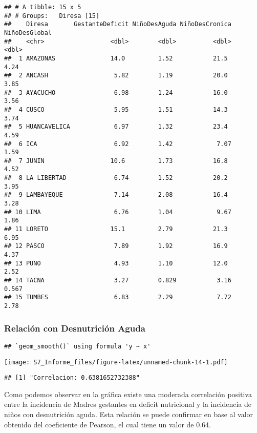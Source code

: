 \documentclass[
]{article}
\begin{document}
\begin{verbatim}
## # A tibble: 15 x 5
## # Groups:   Diresa [15]
##    Diresa       GestanteDeficit NiñoDesAguda NiñoDesCronica NiñoDesGlobal
##    <chr>                  <dbl>        <dbl>          <dbl>         <dbl>
##  1 AMAZONAS               14.0         1.52           21.5          4.24 
##  2 ANCASH                  5.82        1.19           20.0          3.85 
##  3 AYACUCHO                6.98        1.24           16.0          3.56 
##  4 CUSCO                   5.95        1.51           14.3          3.74 
##  5 HUANCAVELICA            6.97        1.32           23.4          4.59 
##  6 ICA                     6.92        1.42            7.07         1.59 
##  7 JUNIN                  10.6         1.73           16.8          4.52 
##  8 LA LIBERTAD             6.74        1.52           20.2          3.95 
##  9 LAMBAYEQUE              7.14        2.08           16.4          3.28 
## 10 LIMA                    6.76        1.04            9.67         1.86 
## 11 LORETO                 15.1         2.79           21.3          6.95 
## 12 PASCO                   7.89        1.92           16.9          4.37 
## 13 PUNO                    4.93        1.10           12.0          2.52 
## 14 TACNA                   3.27        0.829           3.16         0.567
## 15 TUMBES                  6.83        2.29            7.72         2.78
\end{verbatim}

\hypertarget{relaciuxf3n-con-desnutriciuxf3n-aguda}{%
\subsubsection{Relación con Desnutrición
Aguda}\label{relaciuxf3n-con-desnutriciuxf3n-aguda}}

\begin{verbatim}
## `geom_smooth()` using formula 'y ~ x'
\end{verbatim}

\texttt{[image: S7\_Informe\_files/figure-latex/unnamed-chunk-14-1.pdf]}

\begin{verbatim}
## [1] "Correlacion: 0.6381652732388"
\end{verbatim}

Como podemos observar en la gráfica existe una moderada correlación
positiva entre la incidencia de Madres gestantes en deficit nutricional
y la incidencia de niños con desnutrición aguda. Esta relación se puede
confirmar en base al valor obtenido del coeficiente de Pearson, el cual
tiene un valor de 0.64.
\end{document}
